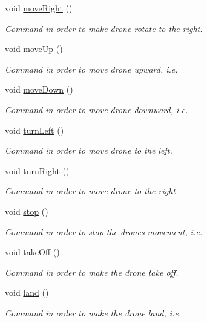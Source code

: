 \begin{DoxyCompactItemize}
void \hyperlink{class_nymeria_a0cf0b3b960e66da1b3761d9df00bf08c}{move\+Right} ()
\begin{DoxyCompactList}\small\item\em Command in order to make drone rotate to the right. \end{DoxyCompactList}\item 
void \hyperlink{class_nymeria_a33ad22560168d804fb4556bf22f37890}{move\+Up} ()
\begin{DoxyCompactList}\small\item\em Command in order to move drone upward, i.\+e. \end{DoxyCompactList}\item 
void \hyperlink{class_nymeria_af317acf40210155d86a451d8498486bb}{move\+Down} ()
\begin{DoxyCompactList}\small\item\em Command in order to move drone downward, i.\+e. \end{DoxyCompactList}\item 
void \hyperlink{class_nymeria_ac5ffdf4e6182fddfc5c082bc3e9c2cff}{turn\+Left} ()
\begin{DoxyCompactList}\small\item\em Command in order to move drone to the left. \end{DoxyCompactList}\item 
void \hyperlink{class_nymeria_a73bc4685c0de47b7a64c168218294765}{turn\+Right} ()
\begin{DoxyCompactList}\small\item\em Command in order to move drone to the right. \end{DoxyCompactList}\item 
void \hyperlink{class_nymeria_ac89e119ce6553bc25a104455159e7dcc}{stop} ()
\begin{DoxyCompactList}\small\item\em Command in order to stop the drone\textquotesingle{}s movement, i.\+e. \end{DoxyCompactList}\item 
void \hyperlink{class_nymeria_ada86813f80111e1e8cec9cbd0e0d3edd}{take\+Off} ()
\begin{DoxyCompactList}\small\item\em Command in order to make the drone take off. \end{DoxyCompactList}\item 
void \hyperlink{class_nymeria_ac552d48476ba1999ce13461bed238bfb}{land} ()
\begin{DoxyCompactList}\small\item\em Command in order to make the drone land, i.\+e. \end{DoxyCompactList}\item 

\end{DoxyCompactItemize}
